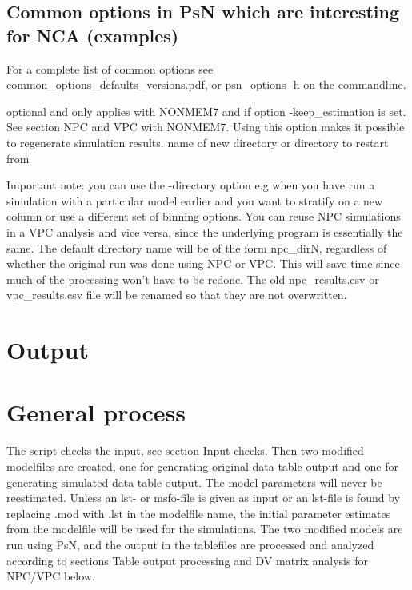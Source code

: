\subsection{Common options in PsN which are interesting for NCA (examples)}
For a complete list of common options see common\_options\_defaults\_versions.pdf, or psn\_options -h on the commandline.

\begin{optionlist}
\nextopt
{}
optional and only applies with NONMEM7 and if option -keep\_estimation is set. See section NPC and VPC with NONMEM7. 
\nextopt
{}
Using this option makes it possible to regenerate simulation results. 
\nextopt
{}
name of new directory or directory to restart from 
\nextopt
{}

\nextopt
\end{optionlist}

Important note: you can use the -directory option e.g when you have run a simulation with a particular model earlier and you want to stratify on a new column or use a different set of binning options. You can reuse NPC simulations in a VPC analysis and vice versa, since the underlying program is essentially the same. The default directory name will be of the form npc\_dirN, regardless of whether the original run was done using NPC or VPC. This will save time since much of the processing won't have to be redone. The old npc\_results.csv or vpc\_results.csv file will be renamed so that they are not overwritten.

\section{Output}

\section{General process}
The script checks the input, see section Input checks. Then two modified modelfiles are created, one for generating original data table output and one for generating simulated data table output. The model parameters will never be reestimated. Unless an lst- or msfo-file is given as input or an lst-file is found by replacing .mod with .lst in the modelfile name, the initial parameter estimates from the modelfile will be used for the simulations. The two modified models are run using PsN, and the output in the tablefiles are processed and analyzed according to sections Table output processing and DV matrix analysis for NPC/VPC below. 

